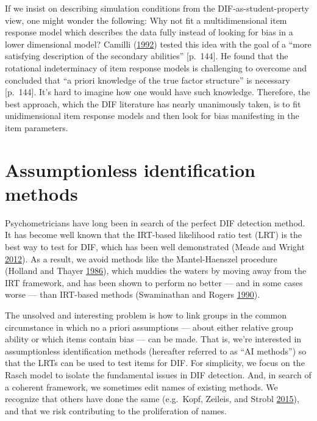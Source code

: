 \documentclass[
  11pt,
]{article}
\begin{document}
If we insist on describing simulation conditions from the DIF-as-student-property view, one might wonder the following: Why not fit a multidimensional item response model which describes the data fully instead of looking for bias in a lower dimensional model? Camilli (\protect\hyperlink{ref-camilli1992conceptual}{1992}) tested this idea with the goal of a \enquote{more satisfying description of the secondary abilities} {[}p.~144{]}. He found that the rotational indeterminacy of item response models is challenging to overcome and concluded that \enquote{a priori knowledge of the true factor structure} is necessary {[}p.~144{]}. It's hard to imagine how one would have such knowledge. Therefore, the best approach, which the DIF literature has nearly unanimously taken, is to fit unidimensional item response models and then look for bias manifesting in the item parameters.

\hypertarget{assumptionless-identification-methods}{%
\section{Assumptionless identification methods}\label{assumptionless-identification-methods}}

Psychometricians have long been in search of the perfect DIF detection method. It has become well known that the IRT-based likelihood ratio test (LRT) is the best way to test for DIF, which has been well demonstrated (Meade and Wright \protect\hyperlink{ref-meade2012solving}{2012}). As a result, we avoid methods like the Mantel-Haenszel procedure (Holland and Thayer \protect\hyperlink{ref-holland1986differential}{1986}), which muddies the waters by moving away from the IRT framework, and has been shown to perform no better --- and in some cases worse --- than IRT-based methods (Swaminathan and Rogers \protect\hyperlink{ref-swaminathan1990detecting}{1990}).

The unsolved and interesting problem is how to link groups in the common circumstance in which no a priori assumptions --- about either relative group ability or which items contain bias --- can be made. That is, we're interested in assumptionless identification methods (hereafter referred to as \enquote{AI methods}) so that the LRTs can be used to test items for DIF. For simplicity, we focus on the Rasch model to isolate the fundamental issues in DIF detection. And, in search of a coherent framework, we sometimes edit names of existing methods. We recognize that others have done the same (e.g.~Kopf, Zeileis, and Strobl \protect\hyperlink{ref-kopf2015framework}{2015}), and that we risk contributing to the proliferation of names.
\end{document}
